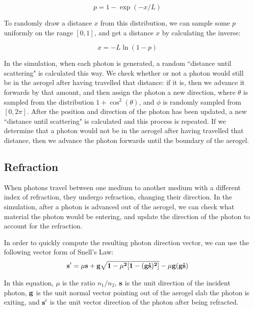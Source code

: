 \begin{equation}
p = 1 - \exp(-x/L)
    \label{eq:scatProb}
\end{equation}

To randomly draw a distance $x$ from this distribution, we can sample some $p$ uniformly on the range $[0,1]$, and get a distance $x$ by calculating the inverse:

\begin{equation}
x =   -L\ln(1-p)
  \label{eq:randomScat}
\end{equation}

In the simulation, when each photon is generated, a random ``distance until scattering" is calculated this way. 
We check whether or not a photon would still be in the aerogel after having travelled that distance: if it is, then we advance it forwards by that amount, and then assign the photon a new direction, where $\theta$ is sampled from the distribution $1 + \cos^2(\theta)$, and $\phi$ is randomly sampled from $[0, 2\pi]$.
After the position and direction of the photon has been updated, a new ``distance until scattering" is calculated and this process is repeated. 
If we determine that a photon would not be in the aerogel after having travelled that distance, then we advance the photon forwards until the boundary of the aerogel.

\subsection{Refraction}
When photons travel between one medium to another medium with a different index of refraction, they undergo refraction, changing their direction.
In the simulation, after a photon is advanced out of the aerogel, we can check what material the photon would be entering, and update the direction of the photon to account for the refraction.

In order to quickly compute the resulting photon direction vector, we can use the following vector form of Snell's Law: \cite{snell}
\begin{equation}
\bf{s'} = \mu\bf{s} + \bf{g}\sqrt{1 - \mu^2[1-(\bf{g \dot s})^2]} - \mu \bf{g}(\bf{g \dot s})
\label{eq:refract}
\end{equation}

In this equation, $\mu$ is the ratio $n_1/n_2$, $\bf{s}$ is the unit direction of the incident photon, $\bf{g}$ is the unit normal vector pointing out of the aerogel slab the photon is exiting, and $\bf{s'}$ is the unit vector direction of the photon after being refracted.

